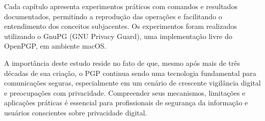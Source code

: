 Cada capítulo apresenta experimentos práticos com comandos e resultados documentados, permitindo a reprodução das operações e facilitando o entendimento dos conceitos subjacentes. Os experimentos foram realizados utilizando o GnuPG (GNU Privacy Guard), uma implementação livre do OpenPGP, em ambiente macOS.

A importância deste estudo reside no fato de que, mesmo após mais de três décadas de sua criação, o PGP continua sendo uma tecnologia fundamental para comunicações seguras, especialmente em um cenário de crescente vigilância digital e preocupações com privacidade. Compreender seus mecanismos, limitações e aplicações práticas é essencial para profissionais de segurança da informação e usuários conscientes sobre privacidade digital.